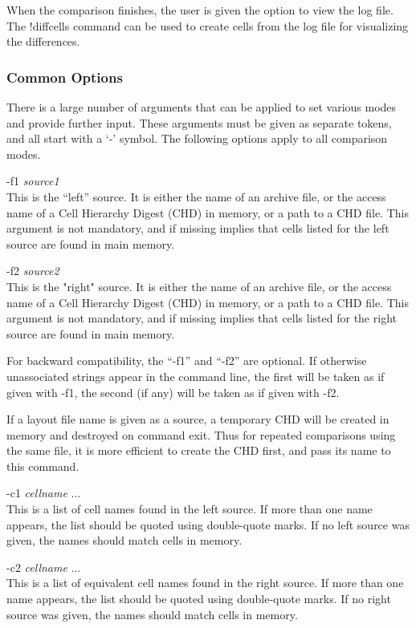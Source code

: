 When the comparison finishes, the user is given the option to view the
log file.  The {\cb !diffcells} command can be used to create cells
from the log file for visualizing the differences.

\subsubsection{Common Options}

There is a large number of arguments that can be applied to set
various modes and provide further input.  These arguments must be
given as separate tokens, and all start with a `{\vt -}' symbol.  The
following options apply to all comparison modes.

\begin{description}
\item{{\vt -f1} {\it source1\/}}\\
This is the ``left'' source.  It is either the name of an archive
file, or the access name of a Cell Hierarchy Digest (CHD) in memory,
or a path to a CHD file.  This argument is not mandatory, and if
missing implies that cells listed for the left source are found in
main memory.

\item{{\vt -f2} {\it source2\/}}\\
This is the "right" source.  It is either the name of an archive file,
or the access name of a Cell Hierarchy Digest (CHD) in memory, or a
path to a CHD file.  This argument is not mandatory, and if missing
implies that cells listed for the right source are found in main
memory.
\end{description}

For backward compatibility, the ``{\vt -f1}'' and ``{\vt -f2}'' are
optional.  If otherwise unassociated strings appear in the command
line, the first will be taken as if given with {\vt -f1}, the second
(if any) will be taken as if given with {\vt -f2}.

If a layout file name is given as a source, a temporary CHD will be
created in memory and destroyed on command exit.  Thus for repeated
comparisons using the same file, it is more efficient to create the
CHD first, and pass its name to this command.

\begin{description}
\item{{\vt -c1} {\it cellname\/} ...}\\
This is a list of cell names found in the left source.  If more than
one name appears, the list should be quoted using double-quote marks. 
If no left source was given, the names should match cells in memory.

\item{{\vt -c2} {\it cellname\/} ...}\\
This is a list of equivalent cell names found in the right source.  If
more than one name appears, the list should be quoted using
double-quote marks.  If no right source was given, the names should
match cells in memory.
\end{description}

